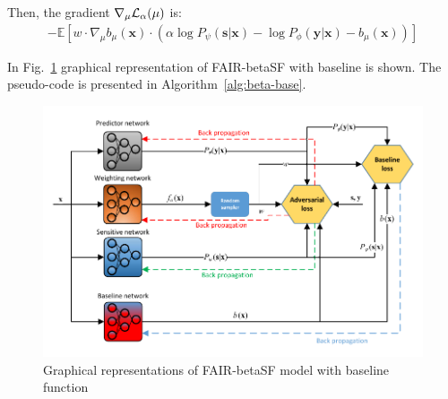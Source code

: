 \documentclass[preprint,12pt]{elsarticle}
\begin{document}
Then, the gradient $\nabla_\mu{\cal L}_\alpha(\mu)$ is:
\begin{equation*}
\begin{split}
-\mathbb{E} \left[w \cdot \nabla_\mu b_\mu(\mathbf{x})\cdot\left(\alpha \log P_\psi(\mathbf{s}|\mathbf{x}) - \log P_\phi(\mathbf{y}|\mathbf{x}) - b_\mu(\mathbf{x})\right)\right]
\end{split}
\end{equation*}

In Fig.~\ref{fig:Fig2} graphical representation of FAIR-betaSF with baseline is shown. The pseudo-code is presented in Algorithm~\ref{alg:beta-base}.

\begin{figure}[h!]
	\center
	\includegraphics[width=1\textwidth]{Fig2.pdf}
	\captionsetup{justification=centering}
	\caption{Graphical representations of FAIR-betaSF model with baseline function}
	\label{fig:Fig2}
\end{figure}
\end{document}
